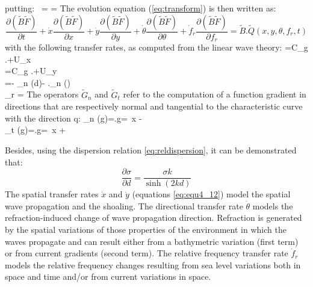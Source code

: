\bequ
\label{eq:GrindEQ__4_10}
\mbox{putting: } =
=
\eequ
The evolution equation (\ref{eq:transform}) is then written as:
\begin{equation} \label{GrindEQ__4_11_}
  \frac{\partial (\tilde{B}\tilde{F})}{\partial t} +\dot{x}\frac{\partial
    (\tilde{B}\tilde{F})}{\partial x} +\dot{y}\frac{\partial (\tilde{B}
    \tilde{F})}{\partial y} +\dot{\theta }\frac{\partial (\tilde{B}
    \tilde{F})}{\partial \theta } +\dot{f}_{r} \frac{\partial (\tilde{B}
    \tilde{F})}{\partial f_{r} } =\tilde{B}.\tilde{Q}(x,y,\theta ,f_{r} ,t)
\end{equation}
with the following transfer rates, as computed from the linear wave theory:
\bequ
\label{eq:equ4_12}
\dsp {}=C_g .\sin \theta +U_x \\[6pt]
\dsp {}=C_g .\cos \theta +U_y\\[6pt] 
\dsp \dot{\theta }=- 
_n (d)- ._n ()\\[6pt]
\dsp {}_{r} = 
\earr
\eequ
The operators $\tilde{G}_n $ and $\tilde{G}_t $ refer to the computation of a
function gradient in directions that are respectively normal and tangential to
the characteristic curve with the direction q:
\bequ
\label{eq:equ4_13}
\dsp {}_{n} (g)=.\vec{\nabla }g=\cos \theta \, 
     {\partial x} \; -\sin \theta \,  \\[6pt]
\dsp {}_{t} (g)=.\vec{\nabla }g=\sin \theta \, 
          {\partial x} \; +\cos \theta \, 
\earr
\eequ

Besides, using the dispersion relation \ref{eq:reldispersion}, it can be
demonstrated that:
\begin{equation} \label{GrindEQ__4_14_}
\frac{\partial \sigma }{\partial d} =\frac{\sigma k}{\sinh (2kd)}
\end{equation}
The spatial transfer rates $\dot{x}$ and $\dot{y}$ (equations \ref{eq:equ4_12})
model the spatial wave propagation and the shoaling. The directional transfer
rate $\dot{\theta }$ models the refraction-induced change of wave propagation
direction. Refraction is generated by the spatial variations of those
properties of the environment in which the waves propagate and can result
either from a bathymetric variation (first term) or from current gradients
(second term). The relative frequency transfer rate $\dot{f}_r $ models the
relative frequency changes resulting from sea level variations both in space
and time and/or from current variations in space.


